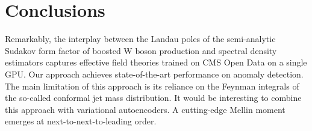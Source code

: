 \section{Conclusions}\label{sec:conclusions}

Remarkably, the interplay between the Landau poles of the semi-analytic
Sudakov form factor of boosted W boson production and spectral density
estimators captures effective field theories trained on CMS Open Data on
a single GPU. Our approach achieves state-of-the-art performance on
anomaly detection. The main limitation of this approach is its reliance
on the Feynman integrals of the so-called conformal jet mass
distribution. It would be interesting to combine this approach with
variational autoencoders. A cutting-edge Mellin moment emerges at
next-to-next-to-leading order.

